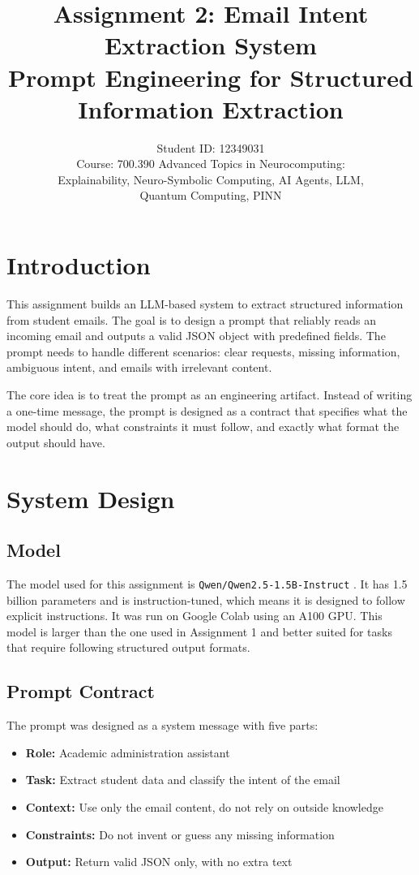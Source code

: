 \documentclass[11pt,a4paper]{article}
\title{Assignment 2: Email Intent Extraction System\\
\large Prompt Engineering for Structured Information Extraction}
\author{
    Student ID: 12349031 \\
    \small Course: 700.390 Advanced Topics in Neurocomputing:\\
    \small Explainability, Neuro-Symbolic Computing, AI Agents, LLM,\\
    \small Quantum Computing, PINN
}
\date{}
\begin{document}
\maketitle

\section{Introduction}

This assignment builds an LLM-based system to extract structured information from student emails. The goal is to design a prompt that reliably reads an incoming email and outputs a valid JSON object with predefined fields. The prompt needs to handle different scenarios: clear requests, missing information, ambiguous intent, and emails with irrelevant content.

The core idea is to treat the prompt as an engineering artifact. Instead of writing a one-time message, the prompt is designed as a contract that specifies what the model should do, what constraints it must follow, and exactly what format the output should have.

\section{System Design}

\subsection{Model}

The model used for this assignment is \texttt{Qwen/Qwen2.5-1.5B-Instruct} \cite{qwen2025}. It has 1.5 billion parameters and is instruction-tuned, which means it is designed to follow explicit instructions. It was run on Google Colab using an A100 GPU. This model is larger than the one used in Assignment 1 and better suited for tasks that require following structured output formats.

\subsection{Prompt Contract}

The prompt was designed as a system message with five parts:

\begin{itemize}
    \item \textbf{Role:} Academic administration assistant
    \item \textbf{Task:} Extract student data and classify the intent of the email
    \item \textbf{Context:} Use only the email content, do not rely on outside knowledge
    \item \textbf{Constraints:} Do not invent or guess any missing information
    \item \textbf{Output:} Return valid JSON only, with no extra text
\end{itemize}
\end{document}
